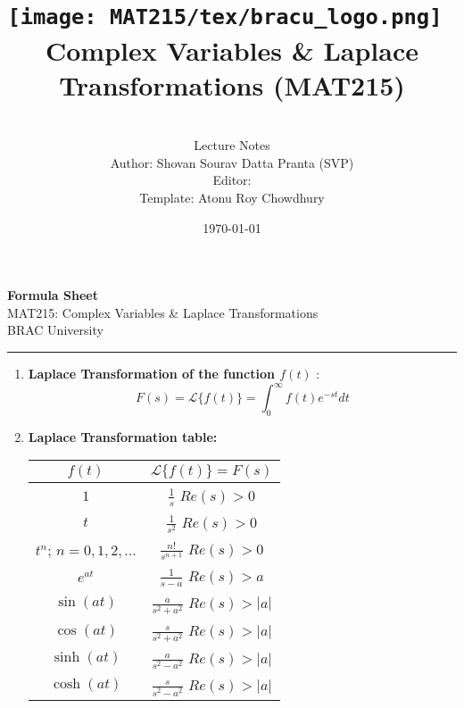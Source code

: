 \documentclass[11pt,oneside,openright,numbers=noenddot]{scrbook}
\title{%
\texttt{[image: MAT215/tex/bracu\_logo.png]}~\\[2cm]
Complex Variables \& Laplace Transformations (MAT215)
}
\subtitle{ ~\\[1cm]
\LARGE{Lecture Notes}\\
\vspace{1cm}
\Large{Author: Shovan Sourav Datta Pranta (SVP)}\\
\Large{Editor: }\\
\Large{Template: Atonu Roy Chowdhury}}
\date{\today}
\begin{document}
\frontmatter

\begin{center}
    \Large \textbf{Formula Sheet} \\
    \Large MAT215: Complex Variables \& Laplace Transformations \\
    \Large BRAC University \\
\end{center}
\hrule 
\begin{enumerate}
    \item \textbf{Laplace Transformation of the function $f(t)$} : $$F(s)=\mathcal{L}\{f(t)\}=\int_0^\infty f(t)e^{-st} dt$$ 
    \item \textbf{Laplace Transformation table:}
    \begin{table}[ht!]
        \centering
        \renewcommand{\arraystretch}{2.25}
        \begin{tabular}{|c|c|}
            \hline
             $f(t)$ & $\mathcal{L}\{f(t)\}=F(s)$  \\
             \hline
            \hline
             $1$ & $\displaystyle \frac{1}{s}$ \hspace{0.5cm} $Re(s)>0$\\
             \hline 
             $t$ & $\displaystyle \frac{1}{s^2}$ \hspace{0.5cm} $Re(s)>0$\\
             \hline
             $t^n$; \hspace{0.1cm} $n=0,1,2,...$ & $\displaystyle \frac{n!}{s^{n+1}}$ \hspace{0.5cm} $Re(s)>0$\\
             \hline
             $e^{at}$ & $\displaystyle \frac{1}{s-a}$ \hspace{0.5cm} $Re(s)>a$\\
             \hline
             $\sin (at)$ & $\displaystyle \frac{a}{s^2+a^2}$ \hspace{0.5cm} $Re(s)>|a|$\\
             \hline
             $\cos (at)$ & $\displaystyle \frac{s}{s^2+a^2}$ \hspace{0.5cm} $Re(s)>|a|$\\
             \hline
             $\sinh (at)$ & $\displaystyle \frac{a}{s^2-a^2}$ \hspace{0.5cm} $Re(s)>|a|$\\
             \hline
             $\cosh (at)$ & $\displaystyle \frac{s}{s^2-a^2}$ \hspace{0.5cm} $Re(s)>|a|$\\

\end{tabular}
\end{table}
\end{enumerate}
\end{document}
